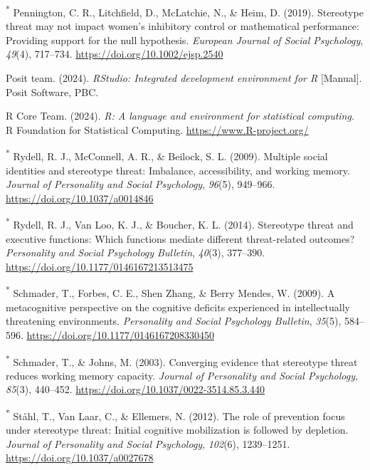 \documentclass[
  stu,floatsintext]{apa7}
\newlength{\cslhangindent}
\newenvironment{CSLReferences}[2] %
 {\begin{list}{}{%
  \setlength{\itemindent}{0pt}
  \setlength{\leftmargin}{0pt}
  \setlength{\parsep}{0pt}
  \ifodd #1
   \setlength{\leftmargin}{\cslhangindent}
   \setlength{\itemindent}{-1\cslhangindent}
  \fi
  \setlength{\itemsep}{#2\baselineskip}}}
 {\end{list}}
\begin{document}
\begin{CSLReferences}{1}{0}
\textsuperscript{*} Pennington, C. R., Litchfield, D., McLatchie, N., \& Heim, D. (2019). Stereotype threat may not impact women's inhibitory control or mathematical performance: {Providing} support for the null hypothesis. \emph{European Journal of Social Psychology}, \emph{49}(4), 717--734. \url{https://doi.org/10.1002/ejsp.2540}

Posit team. (2024). \emph{{RStudio}: {Integrated} development environment for {R}} {[}Manual{]}. Posit Software, PBC.

R Core Team. (2024). \emph{R: A language and environment for statistical computing}. R Foundation for Statistical Computing. \url{https://www.R-project.org/}

\textsuperscript{*} Rydell, R. J., McConnell, A. R., \& Beilock, S. L. (2009). Multiple social identities and stereotype threat: {Imbalance}, accessibility, and working memory. \emph{Journal of Personality and Social Psychology}, \emph{96}(5), 949--966. \url{https://doi.org/10.1037/a0014846}

\textsuperscript{*} Rydell, R. J., Van Loo, K. J., \& Boucher, K. L. (2014). Stereotype threat and executive functions: {Which} functions mediate different threat-related outcomes? \emph{Personality and Social Psychology Bulletin}, \emph{40}(3), 377--390. \url{https://doi.org/10.1177/0146167213513475}

\textsuperscript{*} Schmader, T., Forbes, C. E., Shen Zhang, \& Berry Mendes, W. (2009). A metacognitive perspective on the cognitive deficits experienced in intellectually threatening environments. \emph{Personality and Social Psychology Bulletin}, \emph{35}(5), 584--596. \url{https://doi.org/10.1177/0146167208330450}

\textsuperscript{*} Schmader, T., \& Johns, M. (2003). Converging evidence that stereotype threat reduces working memory capacity. \emph{Journal of Personality and Social Psychology}, \emph{85}(3), 440--452. \url{https://doi.org/10.1037/0022-3514.85.3.440}

\textsuperscript{*} Ståhl, T., Van Laar, C., \& Ellemers, N. (2012). The role of prevention focus under stereotype threat: {Initial} cognitive mobilization is followed by depletion. \emph{Journal of Personality and Social Psychology}, \emph{102}(6), 1239--1251. \url{https://doi.org/10.1037/a0027678}


\end{CSLReferences}
\end{document}
